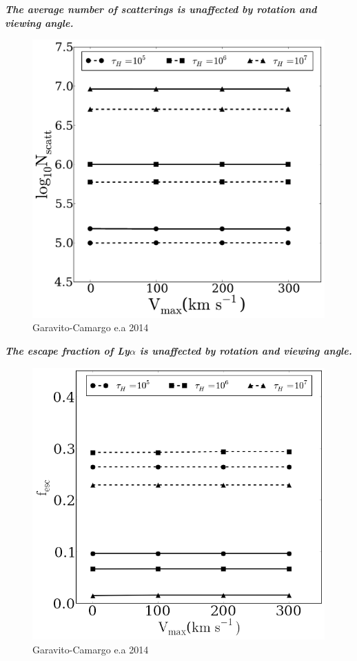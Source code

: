 \documentclass{beamer}
\begin{document}
\begin{frame}{\textit{\textbf{The average number of scatterings is unaffected by rotation and viewing angle.}}}
\begin{figure}
\includegraphics[scale=0.32]{Figures/f13.pdf}
\caption*{Garavito-Camargo e.a 2014}
\end{figure}
\end{frame}

\begin{frame}{\textit{\textbf{The escape fraction of Ly$\alpha$ is unaffected by rotation and viewing angle.}}}
\begin{figure}
\includegraphics[scale=0.35]{Figures/f10.png}
\caption*{Garavito-Camargo e.a 2014}
\end{figure}
\end{frame}
\end{document}
